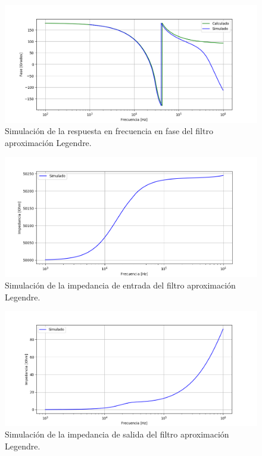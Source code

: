 \begin{figure}[H]
\centering
	\centering
	\includegraphics[width=\textwidth]{Imagenes-Ej1/legendre_hspha_sim.png}
	\caption{Simulación de la respuesta en frecuencia en fase del filtro aproximación Legendre.}
	\label{leg_phase_sim}
\end{figure}

\begin{figure}[H]
\centering
	\centering
	\includegraphics[width=\textwidth]{Imagenes-Ej1/legendre_zin_sim.png}
	\caption{Simulación de la impedancia de entrada del filtro aproximación Legendre.}
	\label{leg_zin_sim}
\end{figure}

\begin{figure}[H]
\centering
	\centering
	\includegraphics[width=\textwidth]{Imagenes-Ej1/legendre_zout_sim.png}
	\caption{Simulación de la impedancia de salida del filtro aproximación Legendre.}
	\label{leg_zout_sim}
\end{figure}

